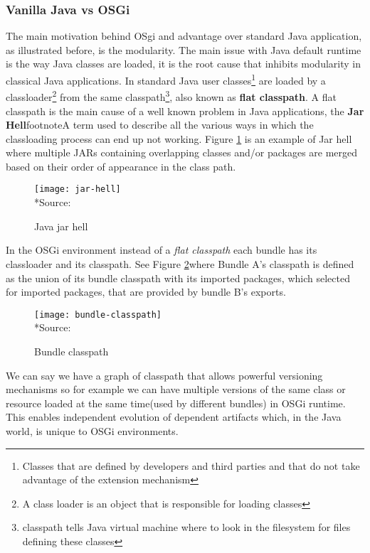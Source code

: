 \subsubsection{Vanilla Java vs OSGi}
The main motivation behind OSgi and advantage over standard Java application, as illustrated before, is the modularity. The main issue with Java default runtime is the way Java classes are loaded, it is the root cause that inhibits modularity in classical Java applications. In standard Java user classes\footnote{Classes that are defined by developers and third parties and that do not take advantage of the extension mechanism} are loaded by a classloader\footnote{A class loader is an object that is responsible for loading classes} from the same classpath\footnote{classpath tells Java virtual machine where to look in the filesystem for files defining these classes}, also known as \textbf{flat classpath}. A flat classpath is the main cause of a well known problem in Java applications, the \textbf{Jar Hell}footnote{A term used to describe all the various ways in which the classloading process can end up not working}. Figure \ref{jar hell} is an example of Jar hell where multiple JARs containing overlapping classes and/or packages are merged based on their order of appearance in the class path.


\begin{figure}[h]
\caption{Java jar hell}
\label{jar hell}
\centering
\texttt{[image: jar-hell]}
\\*Source: \cite[p. 7]{Hall 2011}
\end{figure}  
\FloatBarrier


 In the OSGi environment instead of a \emph{flat classpath} each bundle has its classloader and its classpath. See Figure \ref{bundle classpath}where Bundle A’s classpath is defined as the union of its bundle classpath with its imported packages, which selected for imported packages, that are provided by bundle B’s exports.


\begin{figure}[h]
\caption{Bundle classpath}
\label{bundle classpath}
\centering
\texttt{[image: bundle-classpath]}
\\*Source: \cite[p. 59]{Hall 2011}
\end{figure}  
\FloatBarrier

We can say we have a graph of classpath that allows powerful versioning mechanisms so for example we can have multiple versions of the same class or resource loaded at the same time(used by different bundles) in OSGi runtime. This enables independent evolution of dependent artifacts which, in the Java world, is unique to OSGi environments\citep{semantic versioning 2010}.   

